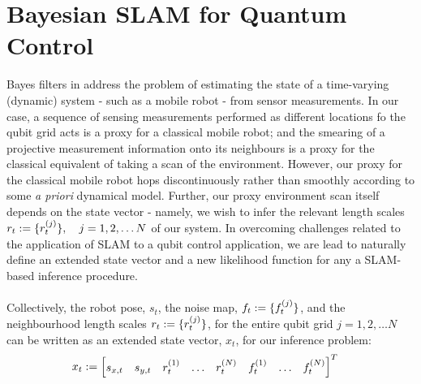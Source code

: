 \section{Bayesian SLAM for Quantum Control} \label{sec:qslam}
Bayes filters in \cite{thrun2001probabilistic} address the problem of estimating the state of a time-varying (dynamic) system - such as a mobile robot - from sensor measurements. In our case, a sequence of sensing measurements performed as different locations fo the qubit grid acts is a proxy for a classical mobile robot; and the smearing of a projective measurement information onto its neighbours is a proxy for the classical equivalent of taking a scan of the environment. However, our proxy for the classical mobile robot hops discontinuously rather than smoothly according to some \textit{ a priori} dynamical model. Further, our proxy environment scan itself depends on the state vector - namely, we wish to infer the relevant length scales $r_{ t}:= \{r^{( j )}_{t}\}, \quad  j= 1, 2, \hdots N $ of our system.  In overcoming challenges related to the application of SLAM to a qubit control application, we are lead to naturally define an extended state vector and a new likelihood function for any a SLAM-based inference procedure. \\
\\
Collectively, the robot pose, $s_t$, the  noise map, $ f_{ t}:=\{f^{( j )}_{t} \}$, and the neighbourhood length scales $r_{ t}:= \{r^{( j )}_{t}\}$, for the entire qubit grid $ j= 1, 2, \hdots N $ can be written as an extended state vector, $x_t$, for our inference problem:
\begin{align}
x_t & := \begin{bmatrix}
s_{ x,t} & 
s_{ y,t}  &
r^{( 1 )}_{t} &
\hdots &
r^{( N )}_{t} &
f^{( 1 )}_{t} &
\hdots &
f^{( N )}_{t} 
\end{bmatrix}^T
\end{align}



